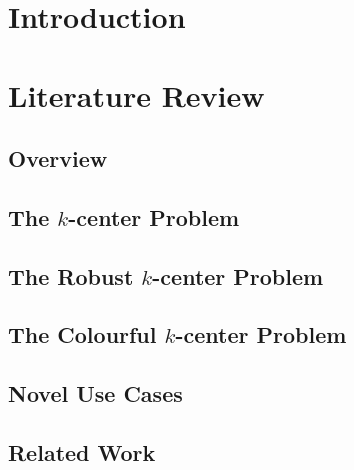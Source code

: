 \documentclass{article}
\begin{document}

\newpage
\begin{abstract}

\end{abstract}
\newpage

\newpage
\tableofcontents
\newpage
\section{Introduction}


\section{Literature Review}\label{section:lit_review}

    \subsection{Overview}
    
    
    \subsection{The \texorpdfstring{$k$}{k}-center Problem}\label{section:k_center}
    
    
    \subsection{The Robust \texorpdfstring{$k$}{k}-center Problem}\label{section:robust_k_center}
    
    
    \subsection{The Colourful \texorpdfstring{$k$}{k}-center Problem}\label{section:colourful_k_center}
    
    
    \subsection{Novel Use Cases}
    

    \subsection{Related Work}
    
    
\end{document}
